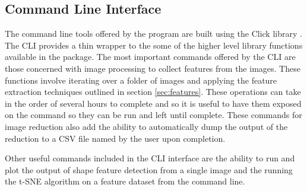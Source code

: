 \subsection{Command Line Interface}
The command line tools offered by the program are built using the Click library \cite{clickLibrary}. The CLI provides a thin wrapper to the some of the higher level library functions available in the package. The most important commands offered by the CLI are those concerned with image processing to collect features from the images. These functions involve iterating over a folder of images and applying the feature extraction techniques outlined in section  \ref{sec:features}. These operations can take in the order of several hours to complete and so it is useful to have them exposed on the command so they can be run and left until complete. These commands for image reduction also add the ability to automatically dump the output of the reduction to a CSV file named by the user upon completion. 

Other useful commands included in the CLI interface are the ability to run and plot the output of shape feature detection from a single image and the running the t-SNE algorithm on a feature dataset from the command line.




